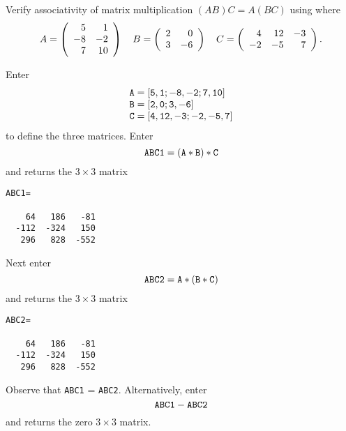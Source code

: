 \documentclass{ximera}
\begin{document}
\begin{computerExercise}\label{YZ_3.6_assoc3}
Verify associativity of matrix multiplication $(AB)C=A(BC)$ using \Matlab where
\[
A=\left(\begin{array}{rrrrrrrrrrrrrrrrrr} 5&1\\-8&-2\\7&10 \end{array}\right) \quad B=\left(\begin{array}{rrrrrrrrrrrrrrrrrr} 2&0\\3&-6 \end{array}\right) \quad C=\left(\begin{array}{rrrrrrrrrrrrrrrrrr} 4&12&-3\\-2&-5&7 \end{array}\right).
\]

\begin{solution}
\soln
Enter 
\[
\begin{array}{l}
{\tt A = [5,1;-8,-2;7,10]} \\
{\tt B = [2,0;3,-6]} \\
{\tt C = [4,12,-3;-2,-5,7]}
\end{array}
\]
to define the three matrices.  Enter 
\[
{\tt ABC1 = (A * B)*C} 
\]
and \Matlab returns the $3\times 3$ matrix
\begin{verbatim}
ABC1=

    64   186   -81
  -112  -324   150
   296   828  -552
\end{verbatim}
Next enter 
\[
{\tt ABC2 = A * ( B*C)} 
\]
and \Matlab returns the $3\times 3$ matrix
\begin{verbatim}
ABC2=

    64   186   -81
  -112  -324   150
   296   828  -552
\end{verbatim}

Observe that {\tt ABC1} = {\tt ABC2}.  Alternatively,  enter 
\[
{\tt ABC1 - ABC2} 
\]
and \Matlab returns the zero $3\times 3$ matrix.
\end{solution}

\end{computerExercise}
\end{document}
